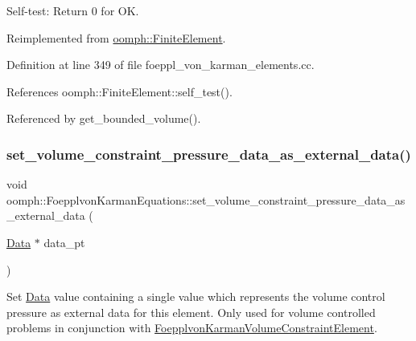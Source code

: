 Self-\/test\+: Return 0 for OK. 



Reimplemented from \hyperlink{classoomph_1_1FiniteElement_af94c5a5e22175d5420b33b3b79e46ed3}{oomph\+::\+Finite\+Element}.



Definition at line 349 of file foeppl\+\_\+von\+\_\+karman\+\_\+elements.\+cc.



References oomph\+::\+Finite\+Element\+::self\+\_\+test().



Referenced by get\+\_\+bounded\+\_\+volume().

\mbox{\label{classoomph_1_1FoepplvonKarmanEquations_aefe4ad7be59aeb518f31bc6a7374d957}} 
\subsubsection{\texorpdfstring{set\+\_\+volume\+\_\+constraint\+\_\+pressure\+\_\+data\+\_\+as\+\_\+external\+\_\+data()}{set\_volume\_constraint\_pressure\_data\_as\_external\_data()}}
{\footnotesize\ttfamily void oomph\+::\+Foepplvon\+Karman\+Equations\+::set\+\_\+volume\+\_\+constraint\+\_\+pressure\+\_\+data\+\_\+as\+\_\+external\+\_\+data (\begin{DoxyParamCaption}\item[{\hyperlink{classoomph_1_1Data}{Data} $\ast$}]{data\+\_\+pt }\end{DoxyParamCaption})\hspace{0.3cm}{\ttfamily [inline]}}



Set \hyperlink{classoomph_1_1Data}{Data} value containing a single value which represents the volume control pressure as external data for this element. Only used for volume controlled problems in conjunction with \hyperlink{classoomph_1_1FoepplvonKarmanVolumeConstraintElement}{Foepplvon\+Karman\+Volume\+Constraint\+Element}. 



